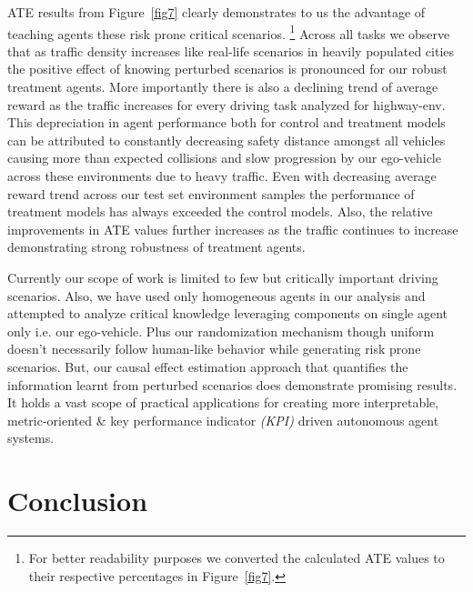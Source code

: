 \documentclass[a4, conference]{IEEEtran}
\begin{document}
    ATE results from Figure~\ref{fig7} clearly demonstrates to us the advantage of teaching agents these risk prone critical scenarios. \footnote{For better readability purposes we converted the calculated ATE values to their respective percentages in Figure~\ref{fig7}.} Across all tasks we observe that as traffic density increases like real-life scenarios in heavily populated cities the positive effect of knowing perturbed scenarios is pronounced for our robust treatment agents. More importantly there is also a declining trend of average reward as the traffic increases for every driving task analyzed for highway-env. This depreciation in agent performance both for control and treatment models can be attributed to constantly decreasing safety distance amongst all vehicles causing more than expected collisions and slow progression by our ego-vehicle across these environments due to heavy traffic. Even with decreasing average reward trend across our test set environment samples the performance of treatment models has always exceeded the control models. Also, the relative improvements in ATE values further increases as the traffic continues to increase demonstrating strong robustness of treatment agents.

    Currently our scope of work is limited to few but critically important driving scenarios. Also, we have used only homogeneous agents in our analysis and attempted to analyze critical knowledge leveraging components on single agent only i.e. our ego-vehicle. Plus our randomization mechanism though uniform doesn't necessarily follow human-like behavior while generating risk prone scenarios. But, our causal effect estimation approach that quantifies the information learnt from perturbed scenarios does demonstrate promising results. It holds a vast scope of practical applications for creating more interpretable, metric-oriented \& key performance indicator \textit{ (KPI)} driven autonomous agent systems.


\section{Conclusion}
\end{document}
